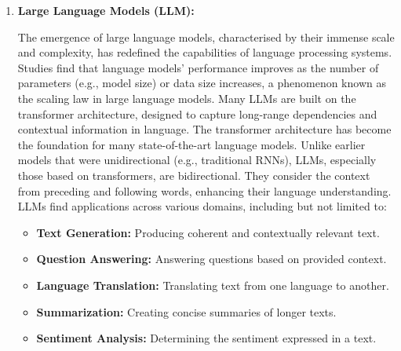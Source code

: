 \begin{enumerate}
{		      ELMo~\footnote{Embeddings from Language Models}~\cite{peters2018deep} was one of the first PLMs which used a bidirectional LSTM to generate word embeddings instead of learning fixed word representations.
		      \textcite{devlin2019bert} introduced BERT (Bidirectional Encoder Representations from Transformers), a transformer-based model pre-trained on a large corpus of text and then fine-tuned it on specific tasks.
		      BERT was a significant advancement in natural language processing, as it demonstrated the potential of pre-trained language models to achieve state-of-the-art performance on a wide range of tasks.
		      These studies introduced the \textit{"pre-training and fine-tuning"} paradigm, which has become a standard practice in the development of language models and inspired a significant number of models, such as GPT-2~\cite{radford2019language}), GPT-3 (\textcite{brown2020language}), T5 (\textcite{raffel2023exploring}, and many others.
	      }
	\item \textbf{Large Language Models (LLM):} {The emergence of large language models, characterised by their immense scale and complexity, has redefined the capabilities of language processing systems.
		      Studies find that language models' performance improves as the number of parameters (e.g., model size) or data size increases, a phenomenon known as the scaling law in large language models.
		      Many LLMs are built on the transformer architecture, designed to capture long-range dependencies and contextual information in language.
		      The transformer architecture has become the foundation for many state-of-the-art language models. Unlike earlier models that were unidirectional (e.g., traditional RNNs), LLMs, especially those based on transformers, are bidirectional. They consider the context from preceding and following words, enhancing their language understanding.
		      LLMs find applications across various domains, including but not limited to:
		      \begin{itemize}
			      \item \textbf{Text Generation:} Producing coherent and contextually relevant text.
			      \item \textbf{Question Answering:} Answering questions based on provided context.
			      \item \textbf{Language Translation:} Translating text from one language to another.
			      \item \textbf{Summarization:} Creating concise summaries of longer texts.
			      \item \textbf{Sentiment Analysis:} Determining the sentiment expressed in a text.

\end{itemize}}
\end{enumerate}
